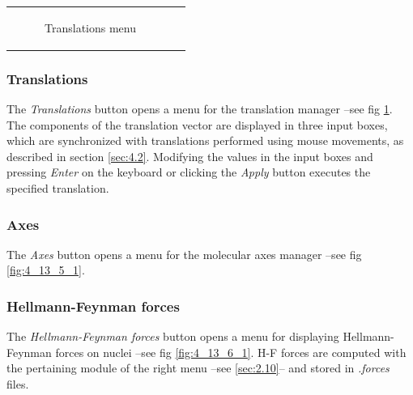 \documentclass[10pt]{article}
\begin{document}
\begin{center}
\begin{tabular}{lr}
\begin{minipage}{.35\linewidth}
\begin{figure}[H]
\begin{center}
        \end{center}
        \vspace*{1mm}
        \caption{Translations menu \label{fig:4_13_4_1}}
    \end{figure}
\end{minipage}
\end{tabular}
\end{center}
\vspace*{5mm}

\subsubsection{Translations \label{sec:4.13.4}}

The {\it Translations} button opens a menu for the translation manager --see fig \ref{fig:4_13_4_1}.
The components of the translation vector are displayed in three input boxes, which
are synchronized with translations performed using mouse movements,
as described in section \ref{sec:4.2}. Modifying the values in the input boxes and pressing {\it Enter} on the keyboard or clicking the {\it Apply} button executes the specified translation.


\subsubsection{Axes \label{sec:4.13.5}}

The {\it Axes} button opens a menu for the molecular axes manager --see fig \ref{fig:4_13_5_1}.


\subsubsection{Hellmann-Feynman forces \label{sec:4.13.6}}

The {\it Hellmann-Feynman forces} button opens a menu for displaying Hellmann-Feynman forces 
on nuclei --see fig \ref{fig:4_13_6_1}. H-F forces are computed with the pertaining
module of the right menu --see \ref{sec:2.10}--
and stored in {\it .forces} files.
\end{document}
